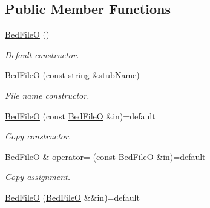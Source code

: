 \subsection*{Public Member Functions}
\begin{DoxyCompactItemize}
\item 
\mbox{\label{classvarfiles_1_1_bed_file_o_abf7e2434bbcf1899be23dbe648c2c529}} 
\hyperlink{classvarfiles_1_1_bed_file_o_abf7e2434bbcf1899be23dbe648c2c529}{Bed\+FileO} ()
\begin{DoxyCompactList}\small\item\em Default constructor. \end{DoxyCompactList}\item 
\hyperlink{classvarfiles_1_1_bed_file_o_ae05c2a79d05548b9026900cd7c6b1a27}{Bed\+FileO} (const string \&stub\+Name)
\begin{DoxyCompactList}\small\item\em File name constructor. \end{DoxyCompactList}\item 
\mbox{\label{classvarfiles_1_1_bed_file_o_a7c7e5ede2ef06fff3729ebf2203873c1}} 
\hyperlink{classvarfiles_1_1_bed_file_o_a7c7e5ede2ef06fff3729ebf2203873c1}{Bed\+FileO} (const \hyperlink{classvarfiles_1_1_bed_file_o}{Bed\+FileO} \&in)=default
\begin{DoxyCompactList}\small\item\em Copy constructor. \end{DoxyCompactList}\item 
\mbox{\label{classvarfiles_1_1_bed_file_o_ad69fa9f3d2c2ef59abdb9d8ab8279814}} 
\hyperlink{classvarfiles_1_1_bed_file_o}{Bed\+FileO} \& \hyperlink{classvarfiles_1_1_bed_file_o_ad69fa9f3d2c2ef59abdb9d8ab8279814}{operator=} (const \hyperlink{classvarfiles_1_1_bed_file_o}{Bed\+FileO} \&in)=default
\begin{DoxyCompactList}\small\item\em Copy assignment. \end{DoxyCompactList}\item 
\mbox{\label{classvarfiles_1_1_bed_file_o_ae2802956eb4b0177c710de6efc21ebe1}} 
\hyperlink{classvarfiles_1_1_bed_file_o_ae2802956eb4b0177c710de6efc21ebe1}{Bed\+FileO} (\hyperlink{classvarfiles_1_1_bed_file_o}{Bed\+FileO} \&\&in)=default

\end{DoxyCompactItemize}
